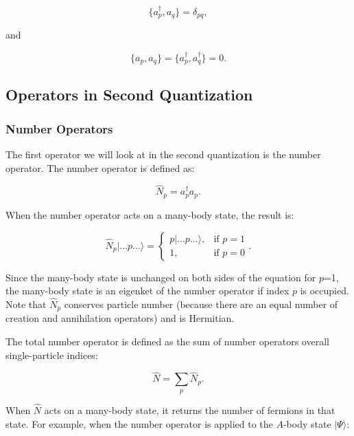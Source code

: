 	\begin{equation}
		\{a^\dagger_p, a_q\} = \delta_{pq},
	\end{equation}

    and

	\begin{equation}
		\{a_p, a_q\} = \{a^\dagger_p, a^\dagger_q\} = 0.
	\end{equation}

\subsection*{Operators in Second Quantization}

	\subsubsection*{Number Operators}
	The first operator we will look at in the second quantization is the number operator. The number operator is defined as:

	\begin{equation}
		\hat{N}_p = a^\dagger_pa_p.
	\end{equation}

	When the number operator acts on a many-body state, the result is:

	\begin{equation}
		\hat{N}_p|...p...\rangle = \begin{cases}
	    									p|...p...\rangle,& \text{if } p = 1\\
	           								1,& \text{if } p = 0								\end{cases}.
	\end{equation}

	Since the many-body state is unchanged on both sides of the equation for $p$=1, the many-body state is an eigenket of the number operator if index $p$ is occupied. Note that $\hat{N}_p$ conserves particle number (because there are an equal number of creation and annihilation operators) and is Hermitian.

	The total number operator is defined as the sum of number operators overall single-particle indices:

	\begin{equation}
		\hat{N} = \sum_p \hat{N}_p.
	\end{equation}

	When $\hat{N}$ acts on a many-body state, it returns the number of fermions in that state. For example, when the number operator is applied to the $A$-body state $|\Psi\rangle$:

